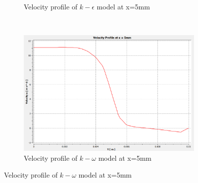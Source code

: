 \begin{figure}[H]
\begin{subfigure}{.48\textwidth}
    \caption{Velocity profile of $k-\epsilon$ model at x=5mm}
\end{subfigure}
    ~
    \begin{subfigure}{.48\textwidth}
    \centering
    \includegraphics[width=.95\linewidth]{images/task2/task2-2/cs2.png}
    \caption{Velocity profile of $k-\omega$ model at x=5mm}
\end{subfigure}



\end{figure}
